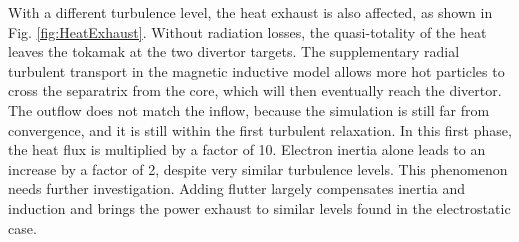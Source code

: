 With a different turbulence level, the heat exhaust is also affected, as shown in Fig. \ref{fig:HeatExhaust}. Without radiation losses, the quasi-totality of the heat leaves the tokamak at the two divertor targets. The supplementary radial turbulent transport in the magnetic inductive model allows more hot particles to cross the separatrix from the core, which will then eventually reach the divertor. The outflow does not match the inflow, because the simulation is still far from convergence, and it is still within the first turbulent relaxation. In this first phase, the heat flux is multiplied by a factor of 10. Electron inertia alone leads to an increase by a factor of 2, despite very similar turbulence levels. This phenomenon needs further investigation. Adding flutter largely compensates inertia and induction and brings the power exhaust to similar levels found in the electrostatic case. \newline

